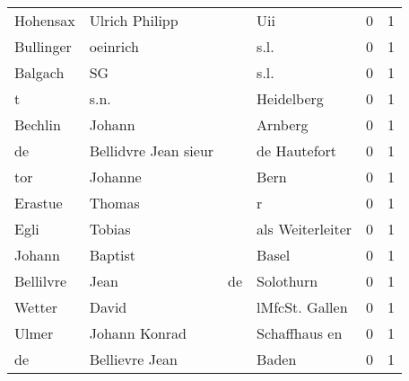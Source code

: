 \begin{tabular}{llllrr}
                 Hohensax &                     Ulrich Philipp &             &                                         Uii &          0 &         1 \\
                Bullinger &                           oeinrich &             &                                        s.l. &          0 &         1 \\
                  Balgach &                                 SG &             &                                        s.l. &          0 &         1 \\
                        t &                               s.n. &             &                                  Heidelberg &          0 &         1 \\
                  Bechlin &                             Johann &             &                                     Arnberg &          0 &         1 \\
                       de &               Bellidvre Jean sieur &             &                                de Hautefort &          0 &         1 \\
                      tor &                            Johanne &             &                                        Bern &          0 &         1 \\
                  Erastue &                             Thomas &             &                                           r &          0 &         1 \\
                     Egli &                             Tobias &             &                            als Weiterleiter &          0 &         1 \\
                   Johann &                            Baptist &             &                                       Basel &          0 &         1 \\
                Bellilvre &                               Jean &          de &                                   Solothurn &          0 &         1 \\
                   Wetter &                              David &             &                              lMfcSt. Gallen &          0 &         1 \\
                    Ulmer &                      Johann Konrad &             &                               Schaffhaus en &          0 &         1 \\
                       de &                     Bellievre Jean &             &                                       Baden &          0 &         1 \\

\end{tabular}
